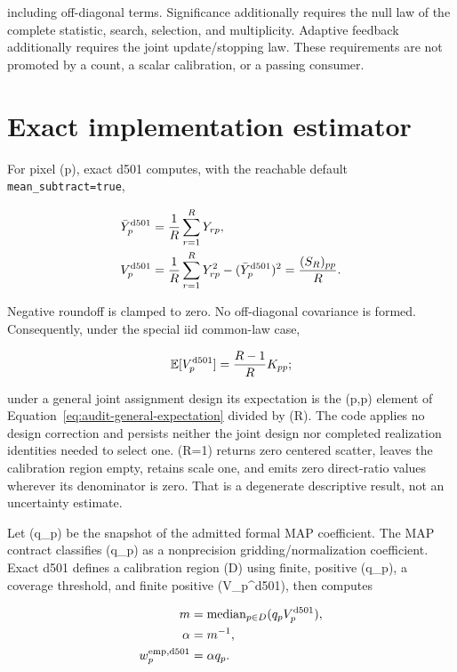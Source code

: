 \documentclass[11pt]{article}
\newcommand{\E}{\mathbb{E}}
\newcommand{\code}[1]{\nolinkurl{#1}}
\begin{document}
including off-diagonal terms.  Significance additionally requires the null law
of the complete statistic, search, selection, and multiplicity.  Adaptive
feedback additionally requires the joint update/stopping law.  These
requirements are not promoted by a count, a scalar calibration, or a passing
consumer.

\section{Exact implementation estimator}

For pixel (p), exact d501 computes, with the reachable default
\code{mean_subtract=true},

\begin{align}
 \bar Y_p^{\rm d501} &= \frac1R\sum_{r=1}^{R}Y_{rp},\\
 V_p^{\rm d501} &= \frac1R\sum_{r=1}^{R}Y_{rp}^{2}
                  -(\bar Y_p^{\rm d501})^2
                =\frac{(S_R)_{pp}}{R}.
 \label{eq:d501-variance}
\end{align}

Negative roundoff is clamped to zero.  No off-diagonal covariance is formed.
Consequently, under the special iid common-law case,

\begin{equation}
 \E[V_p^{\rm d501}]=\frac{R-1}{R}K_{pp};
 \label{eq:d501-iid-bias}
\end{equation}

under a general joint assignment design its expectation is the (p,p)
element of Equation~\eqref{eq:audit-general-expectation} divided by (R).
The code applies no design correction and persists neither the joint design
nor completed realization identities needed to select one.  (R=1) returns
zero centered scatter, leaves the calibration region empty, retains scale one,
and emits zero direct-ratio values wherever its denominator is zero.  That is
a degenerate descriptive result, not an uncertainty estimate.

Let (q_p) be the snapshot of the admitted formal MAP coefficient.  The MAP
contract classifies (q_p) as a nonprecision gridding/normalization
coefficient.  Exact d501 defines a calibration region (D) using finite,
positive (q_p), a coverage threshold, and finite positive (V_p^{\rm d501}),
then computes

\begin{align}
 m &= \operatorname{median}_{p\in D}(q_pV_p^{\rm d501}),\\
 \alpha &= m^{-1},\\
 w_p^{\rm emp,d501} &= \alpha q_p.
 \label{eq:d501-scale}
\end{align}
\end{document}
